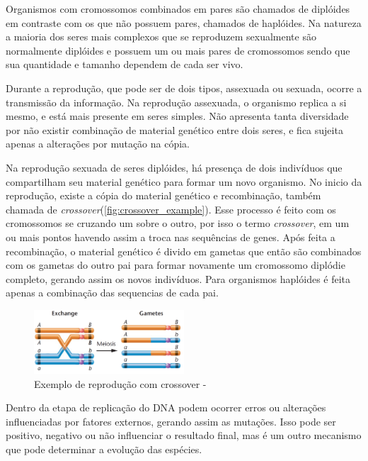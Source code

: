 Organismos com cromossomos combinados em pares são chamados de diplóides em contraste com os que não possuem pares, chamados de haplóides. Na natureza a maioria dos seres mais complexos que se reproduzem sexualmente são normalmente diplóides e possuem um ou mais pares de cromossomos sendo que sua quantidade e tamanho dependem de cada ser vivo.

Durante a reprodução, que pode ser de dois tipos, assexuada ou sexuada, ocorre a transmissão da informação. Na reprodução assexuada, o organismo replica a si mesmo, e está mais presente em seres simples. Não apresenta tanta diversidade por não existir combinação de material genético entre dois seres, e fica sujeita apenas a alterações por mutação na cópia.

Na reprodução sexuada de seres diplóides, há presença de dois indivíduos que compartilham seu material genético para formar um novo organismo. No inicio da reprodução, existe a cópia do material genético e recombinação, também chamada de \textit{crossover}(\autoref{fig:crossover_example}). Esse processo é feito com os cromossomos se cruzando um sobre o outro, por isso o termo \textit{crossover}, em um ou mais pontos havendo assim a troca nas sequências de genes. Após feita a recombinação, o material genético é divido em gametas que então são combinados com os gametas do outro pai para formar novamente um cromossomo diplódie completo, gerando assim os novos indivíduos. Para organismos haplóides é feita apenas a combinação das sequencias de cada pai.

\begin{figure}[ht]
	\begin{center}
	\includegraphics[width=0.5\textwidth]{imagens/cross_over.png}
	\caption{Exemplo de reprodução com crossover - \cite{Klug2011}}
	\label{fig:crossover_example}
	\end{center}
\end{figure}


Dentro da etapa de replicação do DNA podem ocorrer erros ou alterações influenciadas por fatores externos, gerando assim as mutações. Isso pode ser positivo, negativo ou não influenciar o resultado final, mas é um outro mecanismo que pode determinar a evolução das espécies.

